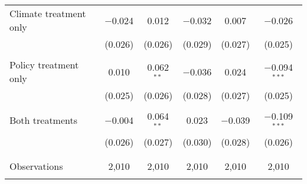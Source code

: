 \begin{tabular}{@{\extracolsep{5pt}}lccccc}
 Climate treatment only & $-$0.024 & 0.012 & $-$0.032 & 0.007 & $-$0.026 \\ 
  & (0.026) & (0.026) & (0.029) & (0.027) & (0.025) \\ 
  & & & & & \\ 
 Policy treatment only & 0.010 & 0.062$^{**}$ & $-$0.036 & 0.024 & $-$0.094$^{***}$ \\ 
  & (0.025) & (0.026) & (0.028) & (0.027) & (0.025) \\ 
  & & & & & \\ 
 Both treatments & $-$0.004 & 0.064$^{**}$ & 0.023 & $-$0.039 & $-$0.109$^{***}$ \\ 
  & (0.026) & (0.027) & (0.030) & (0.028) & (0.026) \\ 
  & & & & & \\ 
\hline \\[-1.8ex] 

Observations & 2,010 & 2,010 & 2,010 & 2,010 & 2,010 \\ 
\hline 
\hline \\[-1.8ex] 
\end{tabular} 